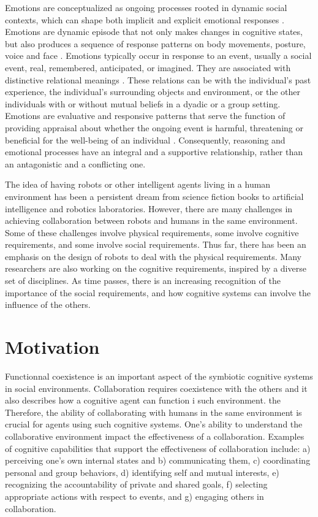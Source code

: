 \documentclass[letterpaper]{article}
\begin{document}
Emotions are conceptualized as ongoing processes rooted in dynamic social
contexts, which can shape both implicit and explicit emotional responses
\cite{parkinson:emotion-social-interaction}. Emotions are dynamic episode that
not only makes changes in cognitive states, but also produces a sequence of
response patterns on body movements, posture, voice and face
\cite{scherer:expression-appraisal}. Emotions typically occur in response to an
event, usually a social event, real, remembered, anticipated, or imagined. They
are associated with distinctive relational meanings
\cite{parkinson:holds-emotion}. These relations can be with the individual's
past experience, the individual's surrounding objects and environment, or the
other individuals with or without mutual beliefs in a dyadic or a group setting.
Emotions are evaluative and responsive patterns that serve the function of
providing appraisal about whether the ongoing event is harmful, threatening or
beneficial for the well-being of an individual \cite{zhu:emotion-action}.
Consequently, reasoning and emotional processes have an integral and a
supportive relationship, rather than an antagonistic and a conflicting one.

The idea of having robots or other intelligent agents living in a human
environment has been a persistent dream from science fiction books to artificial
intelligence and robotics laboratories. However, there are many challenges in
achieving collaboration between robots and humans in the same environment. Some
of these challenges involve physical requirements, some involve cognitive
requirements, and some involve social requirements. Thus far, there has been an
emphasis on the design of robots to deal with the physical requirements. Many
researchers are also working on the cognitive requirements, inspired by a
diverse set of disciplines. As time passes, there is an increasing recognition
of the importance of the social requirements, and how cognitive systems can
involve the influence of the others.

\section{Motivation}

Functionnal coexistence is an important aspect of the symbiotic cognitive
systems in social environments. Collaboration requires coexistence with
the others and it also describes how a cognitive agent can function i such
environment. the Therefore, the ability of collaborating with humans in the same
environment is crucial for agents using such cognitive systems. One's ability to
understand the collaborative environment impact the effectiveness of a
collaboration. Examples of cognitive capabilities that support the effectiveness
of collaboration include: a) perceiving one's own internal states and b)
communicating them, c) coordinating personal and group behaviors, d) identifying
self and mutual interests, e) recognizing the accountability of private and
shared goals, f) selecting appropriate actions with respect to events, and g)
engaging others in collaboration.
\end{document}
